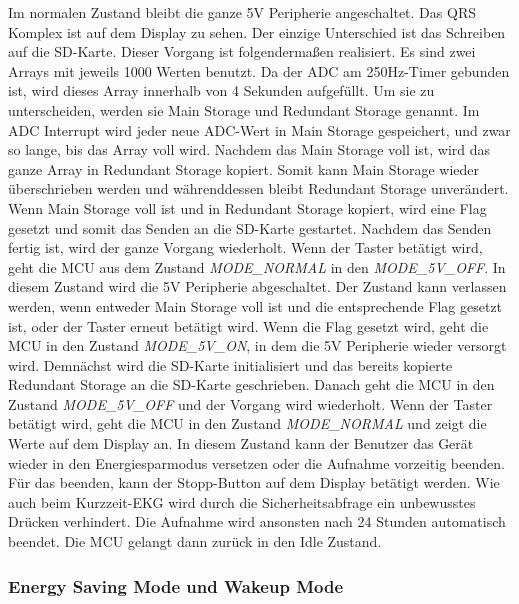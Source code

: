 Im normalen Zustand bleibt die ganze 5V Peripherie angeschaltet. Das QRS Komplex ist auf dem Display zu sehen. Der einzige Unterschied ist das Schreiben auf die SD-Karte. Dieser Vorgang ist folgendermaßen realisiert. Es sind zwei Arrays mit jeweils 1000 Werten benutzt. Da der ADC am 250Hz-Timer gebunden ist, wird dieses Array innerhalb von 4 Sekunden aufgefüllt. Um sie zu unterscheiden, werden sie Main Storage und Redundant Storage genannt. Im ADC Interrupt wird jeder neue ADC-Wert in Main Storage gespeichert, und zwar so lange, bis das Array voll wird. Nachdem das Main Storage voll ist, wird das ganze Array in Redundant Storage kopiert. Somit kann Main Storage wieder überschrieben werden und währenddessen bleibt Redundant Storage unverändert. Wenn Main Storage voll ist und in Redundant Storage kopiert, wird eine Flag gesetzt und somit das Senden an die SD-Karte gestartet. Nachdem das Senden fertig ist, wird der ganze Vorgang wiederholt.
Wenn der Taster betätigt wird, geht die MCU aus dem Zustand \textit{MODE\_NORMAL} in den \textit{MODE\_5V\_OFF}. In diesem Zustand wird die 5V Peripherie abgeschaltet. Der Zustand kann verlassen werden, wenn entweder Main Storage voll ist und die entsprechende Flag gesetzt ist, oder der Taster erneut betätigt wird.
Wenn die Flag gesetzt wird, geht die MCU in den Zustand \textit{MODE\_5V\_ON}, in dem die 5V Peripherie wieder versorgt wird. Demnächst wird die SD-Karte initialisiert und das bereits kopierte Redundant Storage an die SD-Karte geschrieben. Danach geht die MCU in den Zustand \textit{MODE\_5V\_OFF} und der Vorgang wird wiederholt.
Wenn der Taster betätigt wird, geht die MCU in den Zustand \textit{MODE\_NORMAL} und zeigt die Werte auf dem Display an. In diesem Zustand kann der Benutzer das Gerät wieder in den Energiesparmodus versetzen oder die Aufnahme vorzeitig beenden. Für das beenden, kann der Stopp-Button auf dem Display betätigt werden. Wie auch beim Kurzzeit-EKG wird durch die Sicherheitsabfrage ein unbewusstes Drücken verhindert. Die Aufnahme wird ansonsten nach 24 Stunden automatisch beendet. Die MCU gelangt dann zurück in den Idle Zustand.

\subsubsection{Energy Saving Mode und Wakeup Mode}


